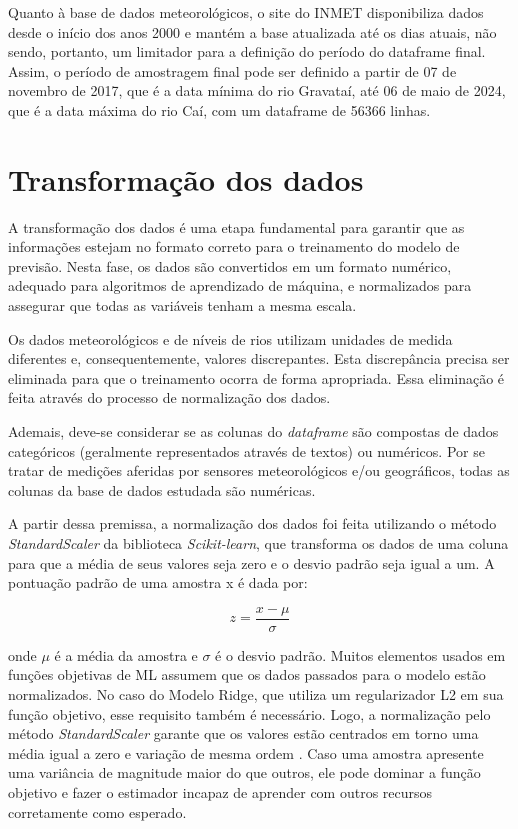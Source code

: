 Quanto à base de dados meteorológicos, o site do INMET disponibiliza dados desde o início dos anos 2000 e mantém a base atualizada até os dias atuais, não sendo, portanto, um limitador para a definição do período do dataframe final. Assim, o período de amostragem final pode ser definido a partir de 07 de novembro de 2017, que é a data mínima do rio Gravataí, até 06 de maio de 2024, que é a data máxima do rio Caí, com um dataframe de 56366 linhas.

\section{Transformação dos dados}
\label{sec:transformacao_dos_dados}

A transformação dos dados é uma etapa fundamental para garantir que as informações estejam no formato correto para o treinamento do modelo de previsão. Nesta fase, os dados são convertidos em um formato numérico, adequado para algoritmos de aprendizado de máquina, e normalizados para assegurar que todas as variáveis tenham a mesma escala.

Os dados meteorológicos e de níveis de rios utilizam unidades de medida diferentes e, consequentemente, valores discrepantes. Esta discrepância precisa ser eliminada para que o treinamento ocorra de forma apropriada. Essa eliminação é feita através do processo de normalização dos dados.

Ademais, deve-se considerar se as colunas do \textit{dataframe} são compostas de dados categóricos (geralmente representados através de textos) ou numéricos. Por se tratar de medições aferidas por sensores meteorológicos e/ou geográficos, todas as colunas da base de dados estudada são numéricas.

A partir dessa premissa, a normalização dos dados foi feita utilizando o método \textit{StandardScaler} da biblioteca \textit{Scikit-learn}, que transforma os dados de uma coluna para que a média de seus valores seja zero e o desvio padrão seja igual a um. A pontuação padrão de uma amostra x é dada por:

\begin{equation}
z = \frac{x - \mu}{\sigma}
\end{equation}

\noindent onde \( \mu \) é a média da amostra e \( \sigma \) é o desvio padrão. Muitos elementos usados em funções objetivas de \gls{ML} assumem que os dados passados para o modelo estão normalizados. No caso do Modelo Ridge, que utiliza um regularizador L2 em sua função objetivo, esse requisito também é necessário. Logo, a normalização pelo método \textit{StandardScaler} garante que os valores estão centrados em torno uma média igual a zero e variação de mesma ordem \cite{scikit_learn_standardscaler}. Caso uma amostra apresente uma variância de magnitude maior do que outros, ele pode dominar a função objetivo e fazer o estimador incapaz de aprender com outros recursos corretamente como esperado.

